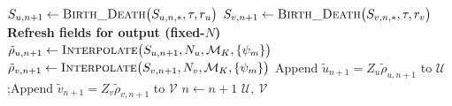 \documentclass[preprint,12pt]{elsarticle}
\theoremstyle{definition}
\theoremstyle{remark}
\begin{document}
\begin{algorithm}
\begin{algorithmic}
    \State $S_{u,n+1} \gets \textsc{Birth\_Death}\big(S_{u,n,*},\tau,r_u\big)$
    \State $S_{v,n+1} \gets \textsc{Birth\_Death}\big(S_{v,n,*},\tau,r_v\big)$
    \State \textbf{Refresh fields for output (fixed-$N$)}
    \State $\tilde\rho_{u,n+1} \gets \textsc{Interpolate}\big(S_{u,n+1},N_u,\mathcal M_K,\{\psi_m\}\big)$
    \State $\tilde\rho_{v,n+1} \gets \textsc{Interpolate}\big(S_{v,n+1},N_v,\mathcal M_K,\{\psi_m\}\big)$
    \State Append $\tilde u_{n+1}=Z_u\tilde\rho_{u,n+1}$ to $\mathcal U$;\quad Append $\tilde v_{n+1}=Z_v\tilde\rho_{v,n+1}$ to $\mathcal V$
    \State $n\gets n+1$
  \EndWhile
  \State \Return $\mathcal U,\ \mathcal V$
\EndProcedure
\end{algorithmic}
\end{algorithm}





\end{document}
